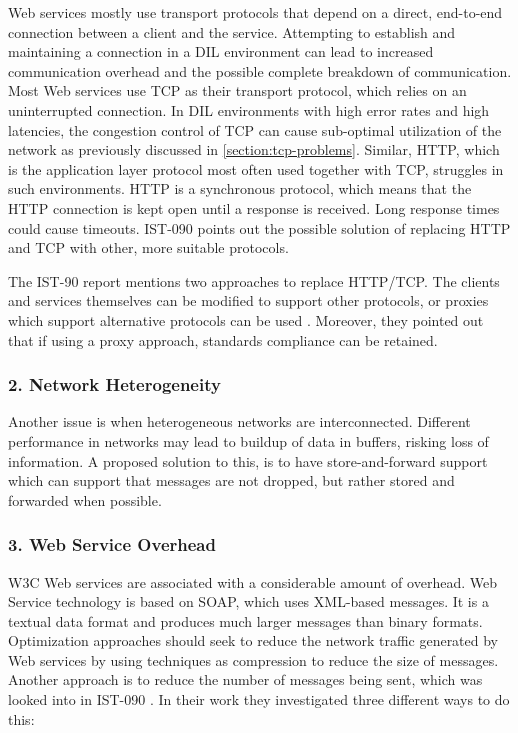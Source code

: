 Web services mostly use transport protocols that depend on a direct, end-to-end
connection between a client and the service. Attempting to establish and
maintaining a connection in a DIL environment can lead to increased communication
overhead and the possible complete breakdown of communication. Most Web services use
TCP as their transport protocol, which relies on an uninterrupted connection.
In DIL environments with high error rates and high latencies,
the congestion control of TCP can cause sub-optimal utilization of the network
as previously discussed in \cref{section:tcp-problems}. Similar, HTTP, which is
the application layer protocol most often used together with TCP, struggles in
such environments. HTTP is a synchronous protocol, which means that the HTTP
connection is kept open until a response is received. Long response times could cause
timeouts. IST-090 points out the possible solution of replacing HTTP and TCP with
other, more suitable protocols.

The IST-90 report mentions two approaches to replace HTTP/TCP. The clients and
services themselves can be modified to support other protocols, or proxies
which support alternative protocols can be used \cite{ist-090}. Moreover, they
pointed out that if using a proxy approach, standards compliance can be
retained.


\subsubsection{2. Network Heterogeneity}

Another issue is when heterogeneous networks are interconnected. Different
performance in networks may lead to buildup of data in buffers, risking loss of
information. A proposed solution to this, is to have store-and-forward support
which can support that messages are not dropped, but rather stored and forwarded when
possible.


\subsubsection{3. Web Service Overhead}

W3C Web services are associated with a considerable amount of overhead. Web
Service technology is based on SOAP, which uses XML-based messages. It is a
textual data format and produces much larger messages than binary formats.
Optimization approaches should seek to reduce the network traffic generated by
Web services by using techniques as compression to reduce the size of messages.
Another approach is to reduce the number of messages being sent, which was
looked into in IST-090 \cite{ist-090}. In their work they investigated three
different ways to do this:

